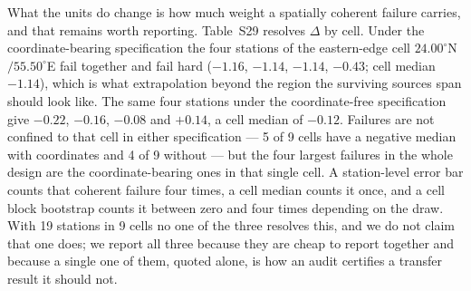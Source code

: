 \documentclass[11pt]{article}
\begin{document}
What the units do change is how much weight a spatially coherent failure carries, and that
remains worth reporting. Table~S29 resolves $\Delta$ by cell. Under the coordinate-bearing
specification the four stations of the eastern-edge cell $24.00^\circ$N$/55.50^\circ$E fail
together and fail hard ($-1.16$, $-1.14$, $-1.14$, $-0.43$; cell median $-1.14$), which is
what extrapolation beyond the region the surviving sources span should look like. The same
four stations under the coordinate-free specification give $-0.22$, $-0.16$, $-0.08$ and
$+0.14$, a cell median of $-0.12$. Failures are not confined to that cell in either
specification --- 5 of 9 cells have a negative median with coordinates and 4 of 9 without
--- but the four largest failures in the whole design are the coordinate-bearing ones in
that single cell. A station-level error bar counts that coherent failure four times, a
cell median counts it once, and a cell block bootstrap counts it between zero and four
times depending on the draw. With 19 stations in 9 cells no one of the three resolves this,
and we do not claim that one does; we report all three because they are cheap to report
together and because a single one of them, quoted alone, is how an audit certifies a
transfer result it should not.
\end{document}
